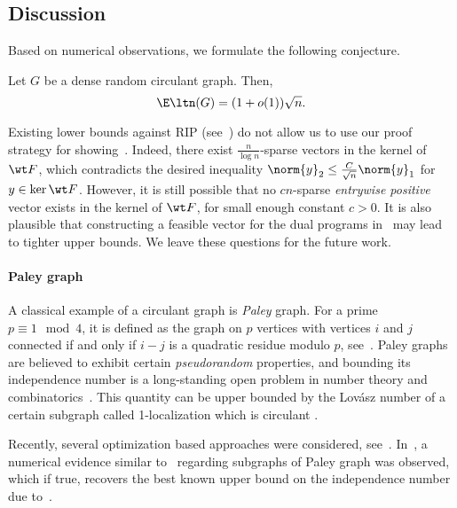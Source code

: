 \subsection{Discussion}
\label{sec:discussion}
Based on numerical observations, we formulate the following conjecture.

\begin{conjecture}
\label{conj:sharp}
    Let \(G\) be a dense random circulant graph. Then, 
    \begin{equation}
        \E \ltn(G) = (1 + o(1)) \sqrt{n}.
    \end{equation}
\end{conjecture}

Existing lower bounds against RIP (see~\cite{bandeira2018discrete,blasiok2019improved}) do not allow us to use our proof strategy for showing~. Indeed, there exist \(\frac{n}{\log n}\)-sparse vectors in the kernel of \(\wt F\), which contradicts the desired inequality \(\norm{y}_2 \leq \frac{C}{\sqrt{n}} \norm{y}_1\) for \(y \in \ker \wt F\). However, it is still possible that no \(c n\)-sparse \emph{entrywise positive} vector exists in the kernel of \(\wt F\), for small enough constant \(c > 0\). It is also plausible that constructing a feasible vector for the dual programs in~ may lead to tighter upper bounds. We leave these questions for the future work.

\paragraph*{Paley graph}
A classical example of a circulant graph is \textit{Paley} graph. For a prime \(p \equiv 1 \mod 4\), it is defined as the graph on \(p\) vertices with vertices \(i\) and \(j\) connected if and only if \(i - j\) is a quadratic residue modulo \(p\), see~\cite{cohen1988clique, baker1996maximal}. Paley graphs are believed to exhibit certain \textit{pseudorandom} properties, and bounding its independence number is a long-standing open problem in number theory and combinatorics~\cite{hanson2021refined}. This quantity can be upper bounded by the Lovász number of a certain subgraph called 1-localization which is circulant \cite{kunisky2024spectral}.

Recently, several optimization based approaches were considered, see~\cite{kobzar2023revisiting,kunisky2024spectral,wanglower}. In~\cite{magsino2019linear}, a numerical evidence similar to~ regarding subgraphs of Paley graph was observed, which if true, recovers the best known upper bound on the independence number due to~\cite{hanson2021refined}. 

